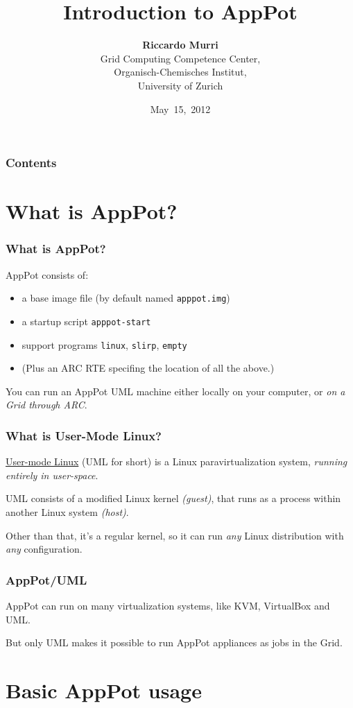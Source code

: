 \documentclass[english,serif,mathserif,xcolor=pdftex,dvipsnames,table]{beamer}
\title[AppPot]{%
  Introduction to AppPot
}
\author[R. Murri]{%
  \textbf{Riccardo Murri} \\
  Grid Computing Competence Center, \\
  Organisch-Chemisches Institut, \\
  University of Zurich
}
\date{May~15,~2012}
\newcommand{\+}{\largeskip}
\begin{document}
\maketitle

\begin{frame}
  \frametitle{Contents}
  \tableofcontents
\end{frame}


\section{What is AppPot?}

\begin{frame}
  \frametitle{What is AppPot?}
  AppPot consists of:
  \begin{itemize}
  \item a base image file (by default named \texttt{apppot.img})
  \item a startup script \texttt{apppot-start}
  \item support programs \texttt{linux}, \texttt{slirp}, \texttt{empty}
  \item (Plus an ARC RTE specifing the location of all the above.)
  \end{itemize}

  \+
  You can run an AppPot UML machine either locally on your computer,
  or \emph{on a Grid through ARC}.
\end{frame}

\begin{frame}
  \frametitle{What is User-Mode Linux?}
  \href{http://user-mode-linux.sf.net/}{User-mode Linux} (UML for
  short) is a Linux paravirtualization system, \emph{running entirely
    in user-space}.

  \+
  UML consists of a modified Linux kernel \emph{(guest)}, that runs as a
  process within another Linux system \emph{(host)}.
  
  \+
  Other than that, it's a regular kernel, so it can run \emph{any} Linux
  distribution with \emph{any} configuration.
\end{frame}

\begin{frame}
  \frametitle{AppPot/UML}
  AppPot can run on many virtualization systems, like KVM, VirtualBox
  and UML.

  \+ But only UML makes it possible to run AppPot appliances as jobs
  in the Grid.
\end{frame}


\section{Basic AppPot usage}
\end{document}
